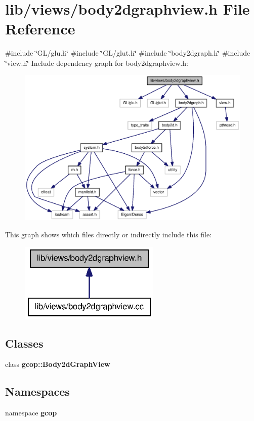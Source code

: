 \section{lib/views/body2dgraphview.h \-File \-Reference}
\label{body2dgraphview_8h}
{\ttfamily \#include \char`\"{}\-G\-L/glu.\-h\char`\"{}}\*
{\ttfamily \#include \char`\"{}\-G\-L/glut.\-h\char`\"{}}\*
{\ttfamily \#include \char`\"{}body2dgraph.\-h\char`\"{}}\*
{\ttfamily \#include \char`\"{}view.\-h\char`\"{}}\*
\-Include dependency graph for body2dgraphview.\-h\-:\nopagebreak
\begin{figure}[H]
\begin{center}
\leavevmode
\includegraphics[width=350pt]{body2dgraphview_8h__incl}
\end{center}
\end{figure}
\-This graph shows which files directly or indirectly include this file\-:\nopagebreak
\begin{figure}[H]
\begin{center}
\leavevmode
\includegraphics[width=190pt]{body2dgraphview_8h__dep__incl}
\end{center}
\end{figure}
\subsection*{\-Classes}
\begin{DoxyCompactItemize}
\item 
class {\bf gcop\-::\-Body2d\-Graph\-View}
\end{DoxyCompactItemize}
\subsection*{\-Namespaces}
\begin{DoxyCompactItemize}
\item 
namespace {\bf gcop}
\end{DoxyCompactItemize}
